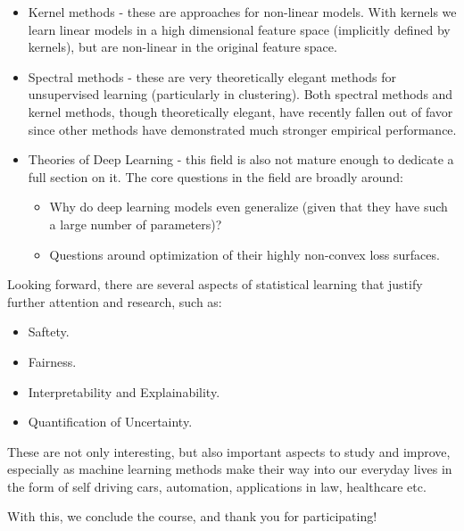 \documentclass[11pt]{article}
\begin{document}
\begin{itemize}
    \item Kernel methods - these are approaches for non-linear models. With kernels we learn linear models in a high dimensional feature space (implicitly defined by kernels), but are non-linear in the original feature space.
    \item Spectral methods - these are very theoretically elegant methods for unsupervised learning (particularly in clustering). Both spectral methods and kernel methods, though theoretically elegant, have recently fallen out of favor since other methods have demonstrated much stronger empirical performance.
    \item Theories of Deep Learning - this field is also not mature enough to dedicate a full section on it. The core questions in the field are broadly around:
    \begin{itemize}
        \item Why do deep learning models even generalize (given that they have such a large number of parameters)?
        \item Questions around optimization of their highly non-convex loss surfaces.
    \end{itemize}
\end{itemize}

Looking forward, there are several aspects of statistical learning that justify further attention and research, such as:
\begin{itemize}
    \item Saftety.
    \item Fairness.
    \item Interpretability and Explainability.
    \item Quantification of Uncertainty.
\end{itemize}

These are not only interesting, but also important aspects to study and improve, especially as machine learning methods make their way into our everyday lives in the form of self driving cars, automation, applications in law, healthcare etc. 

With this, we conclude the course, and thank you for participating!


\printbibliography
\end{document}
